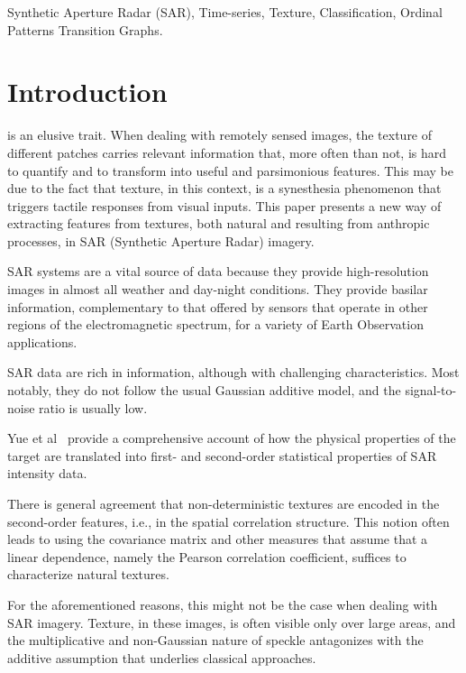 \documentclass[journal]{IEEEtran}
\begin{document}
	\begin{IEEEkeywords}
		Synthetic Aperture Radar (SAR), 
		Time-series, 
		Texture, 
		Classification, 
		Ordinal Patterns Transition Graphs.
	\end{IEEEkeywords}
	
	\IEEEpeerreviewmaketitle
	
	\section{Introduction}
	
	 is an elusive trait.
	When dealing with remotely sensed images, the texture of different patches carries relevant information that, more often than not, is hard to quantify and to transform into useful and parsimonious features.
	This may be due to the fact that texture, in this context, is a synesthesia phenomenon that triggers tactile responses from visual inputs.
	This paper presents a new way of extracting features from textures, both natural and resulting from anthropic processes, in SAR (Synthetic Aperture Radar) imagery.
	
	SAR systems are a vital source of data because they provide high-resolution images in almost all weather and day-night conditions.
	They provide basilar information, complementary to that offered by sensors that operate in other regions of the electromagnetic spectrum, for a variety of Earth Observation applications.
	
	SAR data are rich in information, although with challenging characteristics.
	Most notably, they do not follow the usual Gaussian additive model, and the signal-to-noise ratio is usually low.
	
	Yue et al~\cite{Yue2020Gaussian} provide a comprehensive account of how the physical properties of the target are translated into first- and second-order statistical properties of SAR intensity data.
	
	There is general agreement that non-deterministic textures are encoded in the second-order features, i.e., in the spatial correlation structure.
	This notion often leads to using the covariance matrix and other measures that assume that a linear dependence, namely the Pearson correlation coefficient, suffices to characterize natural textures.
	
	For the aforementioned reasons, this might not be the case when dealing with SAR imagery.
	Texture, in these images, is often visible only over large areas, and the multiplicative and non-Gaussian nature of speckle antagonizes with the additive assumption that underlies classical approaches.
	
\end{document}
